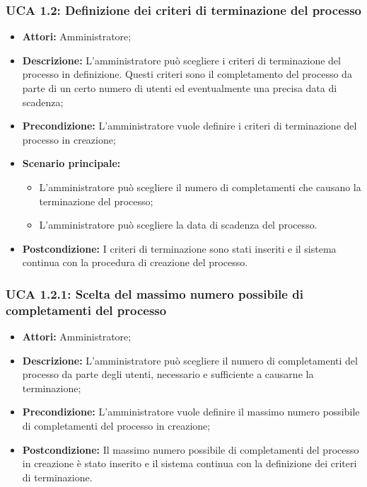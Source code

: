 \subsubsection{UCA 1.2: Definizione dei criteri di terminazione del processo}
\begin{itemize}
\item \textbf{Attori:}
 Amministratore;
\item \textbf{Descrizione:}
 L'amministratore può scegliere i criteri di terminazione del processo in definizione.
Questi criteri sono il completamento del processo da parte di un certo numero di utenti ed eventualmente una precisa data di scadenza;
\item \textbf{Precondizione:}
 L'amministratore vuole definire i criteri di terminazione del processo in creazione;
\item \textbf{Scenario principale:}
\begin{itemize}
\item L'amministratore può scegliere il numero di completamenti che causano la terminazione del processo;
\item L'amministratore può scegliere la data di scadenza del processo.
\end{itemize}
\item \textbf{Postcondizione:} 
I criteri di terminazione sono stati inseriti  e il sistema continua con la procedura di creazione del processo.
\end{itemize}

\hypertarget{A1.2.1}{}
\subsubsection{UCA 1.2.1: Scelta del massimo numero possibile di completamenti del processo}
\begin{itemize}
\item \textbf{Attori:}
 Amministratore;
\item \textbf{Descrizione:}
 L'amministratore può scegliere il numero di completamenti del processo da parte degli utenti, necessario e sufficiente a causarne la terminazione;
\item \textbf{Precondizione:}
 L'amministratore vuole definire il massimo numero possibile di completamenti del processo in creazione;
\item \textbf{Postcondizione:} 
Il massimo numero possibile di completamenti del processo in creazione è stato inserito e il sistema continua con la definizione dei criteri di terminazione.
\end{itemize}

